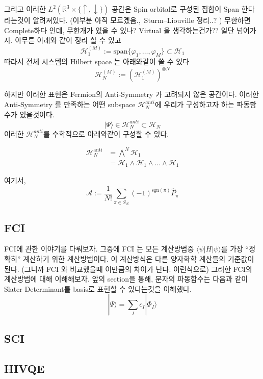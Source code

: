 \documentclass[10pt]{article}
\begin{document}
그리고 이러한 \(L^2(\mathbb{R}^3 \times \{\uparrow, \downarrow\})\) 공간은 Spin orbital로 구성된 집합이 Span 한다 라는것이 알려져있다. 
(이부분 아직 모르곘음.,~Sturm–Liouville 정리..? )
무한하면 Complete하다 인데, 무한개가 있을 수 있나? Virtual 을 생각하는건가?? 
일단 넘어가자. 
아무튼 아래와 같이 정리 할 수 있고 
\[
\mathcal{H}_1^{(M)} := \text{span} \{ \varphi_1, \dots, \varphi_M \} \subset \mathcal{H}_1
\]
따라서 전체 시스템의 Hilbert space 는 아래와같이 쓸 수 있다 
\[
\mathcal{H}_N^{(M)} := \left( \mathcal{H}_1^{(M)} \right)^{\otimes N}
\]

하지만 이러한 표현은 Fermion의 Anti-Symmetry 가 고려되지 않은 공간이다. 이러한 Anti-Symmetry 를 만족하는 어떤 subspace \(\mathcal{H}_N^{anti}\)에 우리가 구성하고자 하는 파동함수가 있을것이다. 
\[
\vert \Psi \rangle \in \mathcal{H}_N^{anti} \subset \mathcal{H}_N
\]
이러한 \(\mathcal{H}_N^{anti}\)를 수학적으로 아래와같이 구성할 수 있다. 


\begin{align*}
\mathcal{H}_N^{\text{anti}} &= \bigwedge^N \mathcal{H}_1\\
&= \mathcal{H}_1 \wedge \mathcal{H}_1 \wedge \dots \wedge \mathcal{H}_1
\end{align*}

여기서, 
\[
\mathcal{A} := \frac{1}{N!} \sum_{\pi \in S_N} (-1)^{\text{sgn}(\pi)} \hat{P}_\pi
\]

\subsection{FCI}
FCI에 관한 이야기를 다뤄보자. 그중에 FCI 는 모든 계산방법중 \(\langle \psi|H|\psi \rangle\)를 가장  \enquote{정확히} 계산하기 위한 계산방법이다. 
이 계산방식은 다른 양자화학 계산들의 기준값이 된다. (그니까 FCI 와 비교했을때 이만큼의 차이가 난다. 이런식으로) 그러한 FCI의 계산방법에 대해 이해해보자. 
앞의 section을 통해, 분자의 파동함수는 다음과 같이 Slater Determinant를 basis로 표현할 수 있다는것을 이해했다. 
\[
|\Psi\rangle = \sum_I c_I |\Phi_I\rangle
\]


\subsection{SCI}

\subsection{HIVQE}
\end{document}
